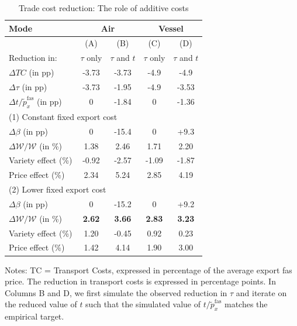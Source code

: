 \documentclass[a4paper,11pt]{article}
\begin{document}
\begin{table}[htbp]
  \centering
  \caption{Trade cost reduction: The role of additive costs} \label{tab:resultats_modele}
\begin{center}
\begin{tabular}{l||c|c||c|c}
\hline \hline
Mode & \multicolumn{2}{|c||}{Air} & \multicolumn{2}{c}{Vessel} \\ \hline
& (A) & (B) & (C) & (D)  \\
Reduction in: & $\tau$ only & $\tau$ and $t$ &$\tau$ only & $\tau$ and $t$\\  \hline
$\Delta TC$ (in pp) &-3.73 &-3.73 &-4.9 &-4.9   \\
$\Delta \tau$ (in pp) & -3.73	&-1.95&-4.9&	-3.53	 \\
$\Delta t/\widetilde{p}_x^{\text{fas}}$ (in pp) & 0&	-1.84&	0&	-1.36 \\ \hline \hline
\multicolumn{4}{l}{(1) Constant fixed export cost} \\ \hline
$\Delta \beta$ (in pp) & 0&	-15.4 & 0	&+9.3 	 \\
$\Delta \mathcal{W}/\mathcal{W}$ (in \%) & 1.38&	2.46 & 1.71	&2.20 	 \\ \hline
Variety effect (\%)& -0.92 	&-2.57	&-1.09	& -1.87 \\
Price effect (\%)&2.34 &5.24	&2.85	& 4.19  \\ \hline
\multicolumn{4}{l}{(2) Lower fixed export cost} \\ \hline
$\Delta \beta$ (in pp) & 0&	-15.2 & 0	&+9.2 	 \\
$\Delta \mathcal{W}/\mathcal{W}$ (in \%) & 	\textbf{2.62}	&\textbf{3.66}	&	\textbf{2.83}&	\textbf{3.23 }  \\\hline
Variety effect (\%)&1.20 &-0.45	&0.92	&0.23 \\
Price effect (\%)&	1.42 &	4.14&		1.90&	3.00 \\ \hline \hline
\end{tabular}
\end{center}
{\parbox[l]{10cm}{ \vspace{4pt}\footnotesize{Notes: TC = Transport Costs, expressed in percentage of the average export fas price. The reduction in transport costs is expressed in percentage points. In Columns B and D, we first simulate the observed reduction in $\tau$ and iterate on the reduced value of $t$ such that the simulated value of $t/\widetilde{p}_x^{\text{fas}}$ matches the empirical target.  }}}
\end{table}
\end{document}
